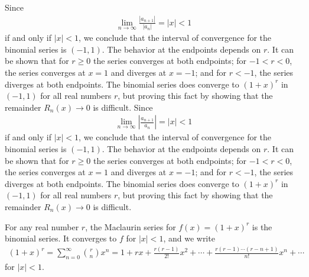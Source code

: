 \documentclass{report}
\begin{document}
    \bigbreak \noindent
    Since
    \begin{align*}
    \lim_{n \to \infty} \frac{\left| a_{n+1} \right|}{\left| a_n \right|} = \left| x \right| < 1
    \end{align*}
    if and only if $\left| x \right| < 1$, we conclude that the interval of convergence for the binomial series is $(-1,1)$. The behavior at the endpoints depends on $r$. It can be shown that for $r \geq 0$ the series converges at both endpoints; for $-1 < r < 0$, the series converges at $x = 1$ and diverges at $x = -1$; and for $r < -1$, the series diverges at both endpoints. The binomial series does converge to $(1 + x)^r$ in $(-1,1)$ for all real numbers $r$, but proving this fact by showing that the remainder $R_n(x) \to 0$ is difficult.
    \bigbreak \noindent 
    Since
    \begin{align*}
        \lim_{n \to \infty} \left| \frac{a_{n+1}}{a_n} \right| = |x| < 1
    \end{align*}
    if and only if \(|x| < 1\), we conclude that the interval of convergence for the binomial series is \((-1,1)\).
    \bigbreak \noindent
    The behavior at the endpoints depends on \(r\). It can be shown that for \(r \geq 0\) the series converges at both endpoints; for \(-1 < r < 0\), the series converges at \(x = 1\) and diverges at \(x = -1\); and for \(r < -1\), the series diverges at both endpoints. The binomial series does converge to \((1+x)^r\) in \((-1,1)\) for all real numbers \(r\), but proving this fact by showing that the remainder \(R_n(x) \to 0\) is difficult.

    \bigbreak \noindent 
    \begin{dfn}
        For any real number \(r\), the Maclaurin series for \( f(x) = (1 + x)^r \) is the binomial series. It converges to \(f\) for \(|x| < 1\), and we write
        \begin{align*}
            (1 + x)^r = \sum_{n=0}^{\infty} \binom{r}{n} x^n = 1 + rx + \frac{r(r-1)}{2!}x^2 + \cdots + \frac{r(r-1) \cdots (r-n+1)}{n!}x^n + \cdots
        \end{align*}
        for \(|x| < 1\).
    \end{dfn}
\end{document}

